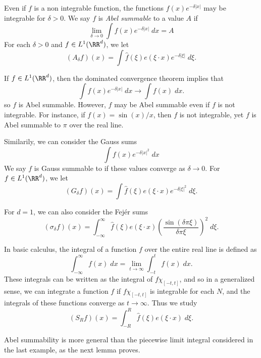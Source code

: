 \begin{example}
	Even if $f$ is a non integrable function, the functions $f(x) e^{-\delta |x|}$ may be integrable for $\delta > 0$. We say $f$ is \emph{Abel summable} to a value $A$ if
	\[ \lim_{\delta \to 0} \int f(x) e^{-\delta |x|}\; dx = A \]
	For each $\delta > 0$ and $f \in L^1(\RR^d)$, we let
	\[ (A_\delta f)(x) = \int \widehat{f}(\xi) e(\xi \cdot x) e^{-\delta |\xi|}\; d\xi. \]
\end{example}

If $f \in L^1(\RR^d)$, then the dominated convergence theorem implies that
%
\[ \int f(x) e^{-\delta |x|}\; dx \to \int f(x)\; dx. \]
%
so $f$ is Abel summable. However, $f$ may be Abel summable even if $f$ is not integrable. For instance, if $f(x) = \sin(x)/x$, then $f$ is not integrable, yet $f$ is Abel summable to $\pi$ over the real line.

\begin{example}
	Similarily, we can consider the Gauss sums
	\[ \int f(x) e^{-\delta |x|^2}\; dx \]
	We say $f$ is Gauss summable to if these values converge as $\delta \to 0$. For $f \in L^1(\RR^d)$, we let
	\[ (G_\delta f)(x) = \int \widehat{f}(\xi) e(\xi \cdot x) e^{-\delta |\xi|^2}\; d\xi. \]
\end{example}

\begin{example}
	For $d = 1$, we can also consider the Fej\'{e}r sums
	\[ (\sigma_\delta f)(x) = \int_{-\infty}^\infty \widehat{f}(\xi) e(\xi \cdot x) \left( \frac{\sin(\delta \pi \xi)}{\delta \pi \xi} \right)^2\; d\xi. \]
\end{example}

\begin{example}
	In basic calculus, the integral of a function $f$ over the entire real line is defined as
	\[ \int_{-\infty}^\infty f(x)\; dx = \lim_{t \to \infty} \int_{-t}^t f(x)\; dx. \]
	These integrals can be written as the integral of $f \chi_{[-t,t]}$, and so in a generalized sense, we can integrate a function $f$ if $f \chi_{[-t,t]}$ is integrable for each $N$, and the integrals of these functions converge as $t \to \infty$. Thus we study
	\[ (S_R f)(x) = \int_{-R}^R \widehat{f}(\xi) e(\xi \cdot x)\; d\xi. \]
\end{example}

Abel summability is more general than the piecewise limit integral considered in the last example, as the next lemma proves.


